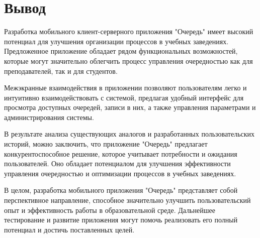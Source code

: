 \clearpage

\section*{\LARGE Вывод}

Разработка мобильного клиент-серверного приложения "Очередь"
имеет высокий потенциал для улучшения организации процессов
в учебных заведениях.
Предложенное приложение обладает рядом функциональных возможностей,
которые могут значительно облегчить процесс управления очередностью
как для преподавателей, так и для студентов.\par
Межэкранные взаимодействия в приложении позволяют пользователям легко
и интуитивно взаимодействовать с системой, предлагая удобный интерфейс
для просмотра доступных очередей, записи в них,
а также управления параметрами и администрирования системы.\par
В результате анализа существующих аналогов и разработанных пользовательских
историй, можно заключить, что приложение "Очередь"
предлагает конкурентоспособное решение,
которое учитывает потребности и ожидания пользователей.
Оно обладает потенциалом для улучшения эффективности управления очередностью
и оптимизации процессов в учебных заведениях.\par
В целом, разработка мобильного приложения "Очередь"
представляет собой перспективное направление,
способное значительно улучшить пользовательский опыт
и эффективность работы в образовательной среде.
Дальнейшее тестирование и развитие приложения могут помочь реализовать
его полный потенциал и достичь поставленных целей.\par

